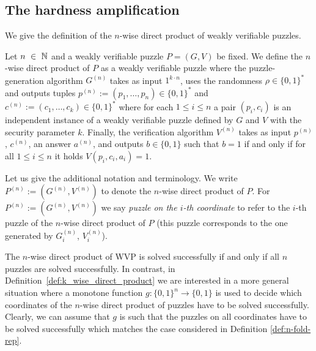 \subsection{The hardness amplification}
We give the definition of the $n$-wise direct product of weakly verifiable puzzles.
%
\begin{definition}
  \label{def:n-fold-rep}
  Let $n~\in~\mathbb{N}$ and a weakly verifiable puzzle $P = (G,V)$ be fixed.
  We define the $n$-wise direct product of $P$ as a weakly verifiable puzzle where the puzzle-generation algorithm
  $G^{(n)}$ takes as input $1^{k \cdot n}$, uses the randomness $\rho \in \{0,1\}^{*}$
  and outputs tuples $p^{(n)} := (p_1, \dotsc, p_n) \in \{0,1\}^{*}$ and $c^{(n)} := (c_1, \dotsc, c_k) \in \{0,1\}^{*}$
  where for each $1 \leq i \leq n$ a pair $(p_i, c_i)$ is an independent instance of a weakly verifiable puzzle defined by $G$ and $V$ with the security parameter $k$.
  Finally, the verification algorithm $V^{(n)}$ takes as input $p^{(n)}$, $c^{(n)}$, an answer $a^{(n)}$, and outputs $b \in \{0,1\}$
  such that $b = 1$ if and only if for all $1 \leq i \leq n$ it holds $V(p_i, c_i, a_i) = 1$.
 \end{definition}
%
Let us give the additional notation and terminology. We write $P^{(n)} := (G^{(n)}, V^{(n)})$ to denote the $n$-wise direct product of $P$.
For $P^{(n) } := (G^{(n)},V^{(n)})$ we say \textit{puzzle on the $i$-th coordinate} to refer to the $i$-th puzzle of the $n$-wise direct product of $P$
(this puzzle corresponds to the one generated by $G^{(n)}_i$,  $V^{(n)}_i$).

The $n$-wise direct product of WVP is solved successfully if and only if all $n$ puzzles are solved successfully.
In contrast, in Definition~\ref{def:k_wise_direct_product} we are interested in a more general situation where a monotone function $g: \{0,1\}^{n} \rightarrow \{0,1\}$
is used to decide which coordinates of the $n$-wise direct product of puzzles have to be solved successfully.
Clearly, we can assume that $g$ is such that the puzzles on all coordinates have to be solved successfully
which matches the case considered in Definition \ref{def:n-fold-rep}.


